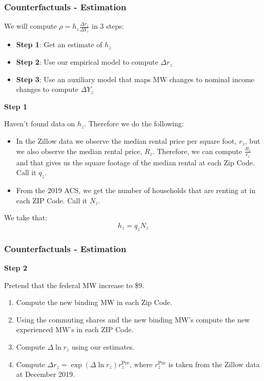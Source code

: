 \documentclass[aspectratio=169]{beamer}
\begin{document}
\begin{frame}
    \frametitle{Counterfactuals - Estimation}
    
    We will compute $\rho = h_z \frac{\Delta r_z}{\Delta Y_z}$ in 3 steps:
    \begin{itemize}
        \item \textbf{Step 1}: Get an estimate of $h_z$
        \item \textbf{Step 2}: Use our empirical model to compute $\Delta r_z$
        \item \textbf{Step 3}: Use an auxiliary model that maps MW changes to nominal income changes to compute $\Delta Y_z$
    \end{itemize}
    
    \pause
    
    \textbf{Step 1}
    
    Haven't found data on $h_z$. Therefore we do the following:
    
    \begin{itemize}
        \item In the Zillow data we observe the median rental price per square foot, $r_z$, but we also observe the median rental price, $R_z$.
        Therefore, we can compute $\frac{R_z}{r_z}$ and that gives us the square footage of the median rental at each Zip Code. Call it $q_z$.
        \item From the 2019 ACS, we get the number of households that are renting at in each ZIP Code. Call it $N_z$.
    \end{itemize}
    
    We take that:
    \[
    h_z = q_z N_z
    \]
\end{frame}

\begin{frame}
    \frametitle{Counterfactuals - Estimation}
    \textbf{Step 2}
    
    Pretend that the federal MW increase to \$9.
    \begin{enumerate}
        \item Compute the new binding MW in each Zip Code.
        \item Using the commuting shares and the new binding MW's compute the new experienced MW's in each ZIP Code.
        \item Compute $\Delta \ln r_z$ using our estimates.
        \item Compute $\Delta r_z = \exp(\Delta \ln r_z) r^{\text{Pre}}_z$, where $r^{\text{Pre}}_z$ is taken from the Zillow data at December 2019. 
    \end{enumerate}
\end{frame}
\end{document}
